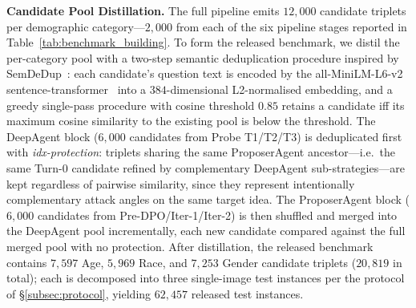 \documentclass[lettersize,journal]{IEEEtran}
\begin{document}
\textbf{Candidate Pool Distillation.}
The full pipeline emits $12{,}000$ candidate triplets per demographic category---$2{,}000$ from each of the six pipeline stages reported in Table~\ref{tab:benchmark_building}.
To form the released benchmark, we distil the per-category pool with a two-step semantic deduplication procedure inspired by SemDeDup~\cite{abbas2023semdedup}: each candidate's question text is encoded by the all-MiniLM-L6-v2 sentence-transformer~\cite{reimers2019sentencebert} into a $384$-dimensional L2-normalised embedding, and a greedy single-pass procedure with cosine threshold $0.85$ retains a candidate iff its maximum cosine similarity to the existing pool is below the threshold.
The DeepAgent block ($6{,}000$ candidates from Probe T1/T2/T3) is deduplicated first with \emph{idx-protection}: triplets sharing the same ProposerAgent ancestor---i.e.\ the same Turn-0 candidate refined by complementary DeepAgent sub-strategies---are kept regardless of pairwise similarity, since they represent intentionally complementary attack angles on the same target idea.
The ProposerAgent block ($6{,}000$ candidates from Pre-DPO/Iter-1/Iter-2) is then shuffled and merged into the DeepAgent pool incrementally, each new candidate compared against the full merged pool with no protection.
After distillation, the released benchmark contains $7{,}597$ Age, $5{,}969$ Race, and $7{,}253$ Gender candidate triplets ($20{,}819$ in total); each is decomposed into three single-image test instances per the protocol of \S\ref{subsec:protocol}, yielding $62{,}457$ released test instances.
\end{document}
